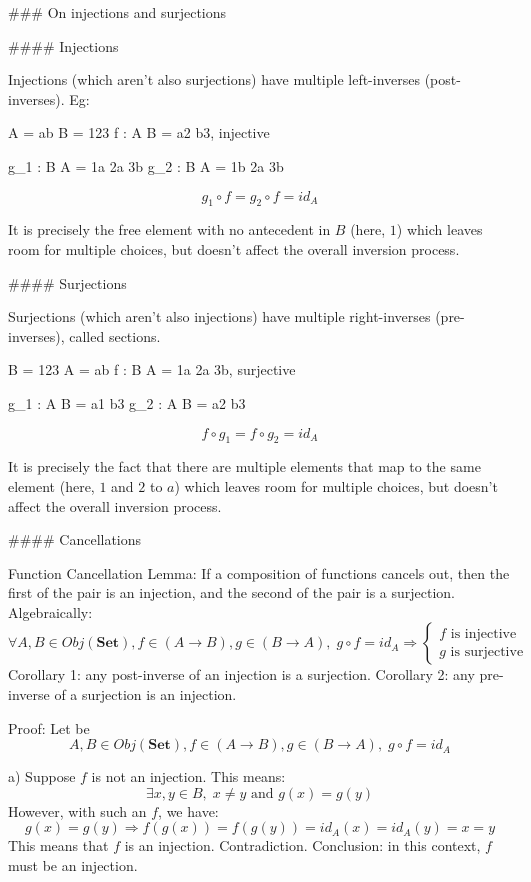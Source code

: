 ### On injections and surjections

#### Injections

Injections (which aren't also surjections) have multiple left-inverses (post-inverses). Eg:

A = ab
B = 123
f : A \to B = a2 b3, injective

g_1 : B \to A = 1a 2a 3b
g_2 : B \to A = 1b 2a 3b

$$g_1 \circ f = g_2 \circ f = id_A$$

It is precisely the free element with no antecedent in $B$ (here, $1$) which leaves room for multiple choices, but doesn't affect the overall inversion process.


#### Surjections

Surjections (which aren't also injections) have multiple right-inverses (pre-inverses), called sections.

B = 123
A = ab
f : B \to A = 1a 2a 3b, surjective

g_1 : A \to B = a1 b3
g_2 : A \to B = a2 b3

$$f \circ g_1 = f \circ g_2 = id_A$$

It is precisely the fact that there are multiple elements that map to the same element (here, $1$ and $2$ to $a$) which leaves room for multiple choices, but doesn't affect the overall inversion process.



#### Cancellations

Function Cancellation Lemma: If a composition of functions cancels out, then the first of the pair is an injection, and the second of the pair is a surjection. Algebraically:
$$
\forall A, B \in Obj(\textbf{Set}),
f \in (A \to B), g \in (B \to A), \;
	g \circ f = id_A
\Rightarrow
	\begin{cases}
		f \text{ is injective} \\
		g \text{ is surjective}
	\end{cases}
$$
Corollary 1: any post-inverse of an injection is a surjection.
Corollary 2: any pre-inverse of a surjection is an injection.

Proof: Let be 
$$A, B \in Obj(\textbf{Set}), f \in (A \to B), g \in (B \to A), \; g \circ f = id_A$$

a) Suppose $f$ is not an injection. This means:
$$\exists x, y \in B, \; x \neq y \text{ and } g(x) = g(y)$$
However, with such an $f$, we have:
$$g(x) = g(y) \Rightarrow f(g(x)) = f(g(y)) = id_A(x) = id_A(y) = x = y$$
This means that $f$ is an injection. Contradiction.
Conclusion: in this context, $f$ must be an injection.

